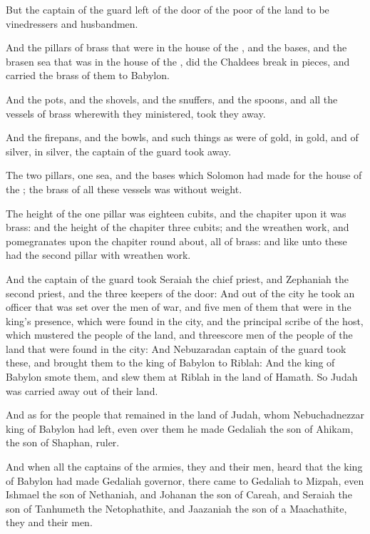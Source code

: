 \verse But the captain of the guard left of the door of the poor of the land to be vinedressers and husbandmen.

\verse And the pillars of brass that were in the house of the \LORD, and the bases, and the brasen sea that was in the house of the \LORD, did the Chaldees break in pieces, and carried the brass of them to Babylon.

\verse And the pots, and the shovels, and the snuffers, and the spoons, and all the vessels of brass wherewith they ministered, took they away.

\verse And the firepans, and the bowls, and such things as were of gold, in gold, and of silver, in silver, the captain of the guard took away.

\verse The two pillars, one sea, and the bases which Solomon had made for the house of the \LORD; the brass of all these vessels was without weight.

\verse The height of the one pillar was eighteen cubits, and the chapiter upon it was brass: and the height of the chapiter three cubits; and the wreathen work, and pomegranates upon the chapiter round about, all of brass: and like unto these had the second pillar with wreathen work.

\verse And the captain of the guard took Seraiah the chief priest, and Zephaniah the second priest, and the three keepers of the door: \verse And out of the city he took an officer that was set over the men of war, and five men of them that were in the king's presence, which were found in the city, and the principal scribe of the host, which mustered the people of the land, and threescore men of the people of the land that were found in the city: \verse And Nebuzaradan captain of the guard took these, and brought them to the king of Babylon to Riblah: \verse And the king of Babylon smote them, and slew them at Riblah in the land of Hamath. So Judah was carried away out of their land.

\verse And as for the people that remained in the land of Judah, whom Nebuchadnezzar king of Babylon had left, even over them he made Gedaliah the son of Ahikam, the son of Shaphan, ruler.

\verse And when all the captains of the armies, they and their men, heard that the king of Babylon had made Gedaliah governor, there came to Gedaliah to Mizpah, even Ishmael the son of Nethaniah, and Johanan the son of Careah, and Seraiah the son of Tanhumeth the Netophathite, and Jaazaniah the son of a Maachathite, they and their men.

